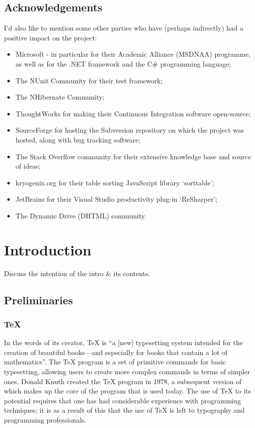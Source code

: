 \documentclass{l4proj}
\begin{document}
\section*{Acknowledgements}
I'd also like to mention some other parties who have (perhaps indirectly) had a positive impact on the project: \
\begin{itemize} 
\item Microsoft - in particular for their Academic Alliance (MSDNAA) programme, as well as for the .NET framework and the C\# programming language;
\item The NUnit Community for their test framework;
\item The NHibernate Community;
\item ThoughtWorks for making their Continuous Integration software open-source;
\item SourceForge for hosting the Subversion repository on which the project was hosted, along with bug tracking software;
\item The Stack Overflow community for their extensive knowledge base and source of ideas;
\item kryogenix.org for their table sorting JavaScript library `sorttable';
\item JetBrains for their Visual Studio productivity plug-in `ReSharper';
\item The Dynamic Drive (DHTML) community.
\end{itemize}

\educationalconsent
%
%
\tableofcontents
\chapter{Introduction}
\label{intro}
Discuss the intention of the intro \& its contents.

\section{Preliminaries}
\subsection{\TeX{}}
In the words of its creator, \TeX{} is ``a [new] typesetting system intended for the creation of beautiful books---and especially for books that contain a lot of mathematics''\cite{DK84}.  The \TeX{} program is a set of primitive commands for basic typesetting, allowing users to create more complex commands in terms of simpler ones.  Donald Knuth created the \TeX{} program in 1978, a subsequent version of which makes up the core of the program that is used today\cite{TeXOrigin}.  The use of \TeX{} to its potential requires that one has had considerable experience with programming techniques; it is as a result of this that the use of \TeX{} is left to typography and programming professionals\cite{KD95}.
\end{document}
